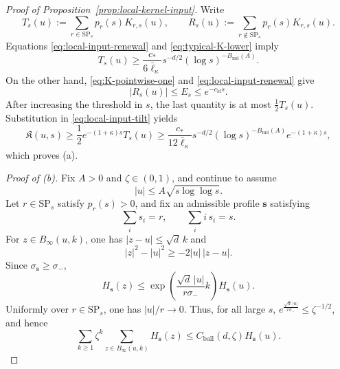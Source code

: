\documentclass[letterpaper,11pt,reqno]{amsart}
\theoremstyle{definition}
\newcommand{\IK}{\mathfrak{K}}
\begin{document}
\begin{proof}[Proof of Proposition~\ref{prop:local-kernel-input}]
Write
\[
T_s(u):=\sum_{r\in\mathrm{SP}_s}p_r(s)K_{r,s}(u),
\qquad
R_s(u):=\sum_{r\notin\mathrm{SP}_s}p_r(s)K_{r,s}(u).
\]
Equations \eqref{eq:local-input-renewal} and \eqref{eq:typical-K-lower} imply
\begin{equation}\label{eq:typical-mass-lower}
T_s(u)
\ge
\frac{c_*}{6\bar\ell_\kappa}
s^{-d/2}(\log s)^{-B_{\mathrm{md}}(A)}.
\end{equation}
On the other hand, \eqref{eq:K-pointwise-one} and \eqref{eq:local-input-renewal} give
\[
|R_s(u)|\le E_s\le e^{-c_{\mathrm{ld}}s}.
\]
After increasing the threshold in \(s\), the last quantity is at most
\(\frac12T_s(u)\). Substitution in \eqref{eq:local-input-tilt} yields
\[
\IK(u,s)
\ge
\frac12e^{-(1+\kappa)s}T_s(u)
\ge
\frac{c_*}{12\bar\ell_\kappa}
s^{-d/2}(\log s)^{-B_{\mathrm{md}}(A)}e^{-(1+\kappa)s},
\]
which proves (a).





\smallskip
\noindent\textit{Proof of {\rm(b)}.}
Fix \(A>0\) and \(\zeta\in(0,1)\), and continue to assume
\[
|u|\le A\sqrt{s\log\log s}.
\]
Let \(r\in\mathrm{SP}_s\) satisfy \(p_r(s)>0\), and fix an admissible profile
\(\mathbf s\) satisfying
\[
\sum_i s_i=r,\qquad \sum_i i\,s_i=s.
\]
For \(z\in B_\infty(u,k)\), one has \(|z-u|\le\sqrt d\,k\) and
\[
|z|^2-|u|^2\ge-2|u|\,|z-u|.
\]
Since \(\sigma_{\mathbf s}\ge\sigma_-\),
\[
H_{\mathbf s}(z)
\le
\exp\!\left(\frac{\sqrt d\,|u|}{r\sigma_-}k\right)H_{\mathbf s}(u).
\]
Uniformly over \(r\in\mathrm{SP}_s\), one has \(|u|/r\to0\). Thus, for all large \(s\), $e^{\frac{\sqrt d\,|u|}{r\sigma_-}}\le\zeta^{-1/2}$,
and hence
\begin{equation}\label{eq:weighted-H-ball}
\sum_{k\ge1}\zeta^k
\sum_{z\in B_\infty(u,k)}H_{\mathbf s}(z)
\le
C_{\mathrm{ball}}(d,\zeta)H_{\mathbf s}(u).
\end{equation}


\end{proof}
\end{document}
